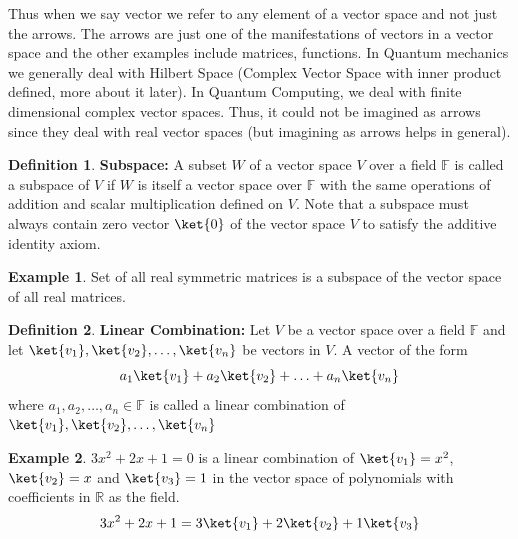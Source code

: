 \documentclass[12pt, oneside]{book}
\theoremstyle{definition}
\newtheorem{definition}{Definition}[section]
\theoremstyle{definition}
\newtheorem{example}{Example}[section]
\theoremstyle{remark}
\begin{document}
Thus when we say vector we refer to any element of a vector space and not just the arrows. The arrows are just one of the manifestations of vectors in a vector space and the other
examples include matrices, functions. In Quantum mechanics we generally deal with Hilbert Space (Complex Vector Space with inner product defined, more about it later). 
In Quantum Computing, we deal with finite dimensional complex vector spaces. Thus, it could not be imagined as arrows since they deal with real vector spaces (but imagining as arrows helps in general).

\begin{definition}
    \textbf{Subspace:} A subset $W$ of a vector space $V$ over a field $\mathbb{F}$ is called a subspace of $V$ if $W$ is itself a vector space over $\mathbb{F}$
    with the same operations of addition and scalar multiplication defined on $V$.
    Note that a subspace must always contain zero vector $\ket{0}$ of the vector space $V$ to satisfy the additive identity axiom.
\end{definition}

\begin{example}
    Set of all real symmetric matrices is a subspace of the vector space of all real matrices.
\end{example}

\begin{definition}
    \textbf{Linear Combination:} Let $V$ be a vector space over a field $\mathbb{F}$ and let $\ket{v_1},\ket{v_2},\ldots,\ket{v_n}$ be vectors in $V$. A vector of the form
    \begin{equation}
        a_1\ket{v_1}+a_2\ket{v_2}+\ldots+a_n\ket{v_n}
    \end{equation}
    where $a_1,a_2,\ldots,a_n\in\mathbb{F}$ is called a linear combination of $\ket{v_1},\ket{v_2},\ldots,\ket{v_n}$
\end{definition}

\begin{example}
    $3x^2+2x+1=0$ is a linear combination of $\ket{v_1}=x^2$, $\ket{v_2}=x$ and $\ket{v_3}=1$ in the vector space of polynomials with
    coefficients in $\mathbb{R}$ as the field.
    \[
        3x^2+2x+1=3\ket{v_1}+2\ket{v_2}+1\ket{v_3}
    \]
\end{example}
\end{document}
